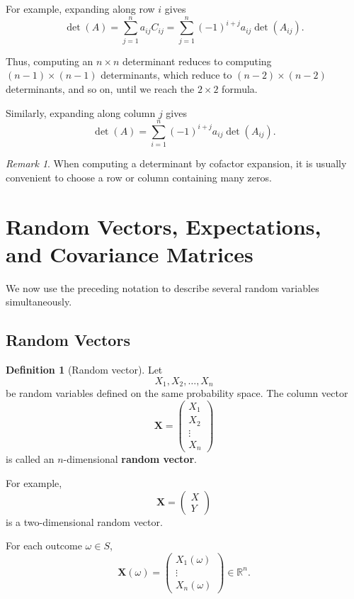 \documentclass[11pt]{article}
\newcommand{\Sample}{S}
\theoremstyle{definition}
\newtheorem{definition}{Definition}
\theoremstyle{plain}
\theoremstyle{remark}
\newtheorem{remark}{Remark}
\begin{document}
For example, expanding along row $i$ gives
\[
{
\det(A)
=
\sum_{j=1}^n a_{ij}C_{ij}
=
\sum_{j=1}^n
(-1)^{i+j}a_{ij}\det(A_{ij}).
}
\]

Thus, computing an $n\times n$ determinant reduces to computing
$(n-1)\times(n-1)$ determinants, which reduce to
$(n-2)\times(n-2)$ determinants, and so on, until we reach the
$2\times2$ formula.

Similarly, expanding along column $j$ gives
\[
\det(A)
=
\sum_{i=1}^n
(-1)^{i+j}a_{ij}\det(A_{ij}).
\]

\begin{remark}
When computing a determinant by cofactor expansion, it is usually
convenient to choose a row or column containing many zeros.
\end{remark}


\section{Random Vectors, Expectations, and Covariance Matrices}

We now use the preceding notation to describe several random
variables simultaneously.


\subsection*{Random Vectors}

\begin{definition}[Random vector]
Let
\[
X_1,X_2,\ldots,X_n
\]
be random variables defined on the same probability space. The
column vector
\[
{
\mathbf{X}
=
\begin{pmatrix}
X_1\\
X_2\\
\vdots\\
X_n
\end{pmatrix}
}
\]
is called an $n$-dimensional \textbf{random vector}.
\end{definition}

For example,
\[
\mathbf{X}
=
\begin{pmatrix}
X\\
Y
\end{pmatrix}
\]
is a two-dimensional random vector.

For each outcome $\omega\in\Sample$,
\[
\mathbf{X}(\omega)
=
\begin{pmatrix}
X_1(\omega)\\
\vdots\\
X_n(\omega)
\end{pmatrix}
\in\mathbb{R}^n.
\]
\end{document}
